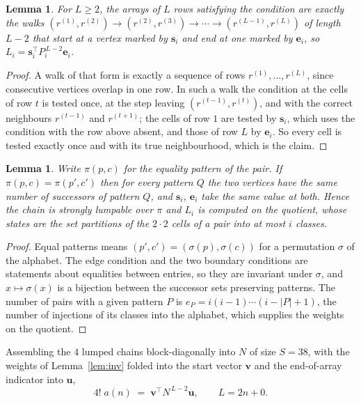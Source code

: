 \documentclass[11pt,a4paper]{article}
\theoremstyle{plain}
\newtheorem{lemma}[theorem]{Lemma}
\theoremstyle{definition}
\begin{document}
\begin{lemma}\label{lem:walk}
For $L\ge2$, the arrays of $L$ rows satisfying the condition are exactly the walks
$(r^{(1)},r^{(2)})\to(r^{(2)},r^{(3)})\to\cdots\to(r^{(L-1)},r^{(L)})$ of length
$L-2$ that start at a vertex marked by $\mathbf{s}_i$ and end at one marked by
$\mathbf{e}_i$, so
$L_i=\mathbf{s}_i^{\!\top}P_i^{\,L-2}\mathbf{e}_i$.
\end{lemma}

\begin{proof}
A walk of that form is exactly a sequence of rows $r^{(1)},\dots,r^{(L)}$, since
consecutive vertices overlap in one row. In such a walk the condition at the cells of
row $t$ is tested once, at the step leaving $(r^{(t-1)},r^{(t)})$, and with the
correct neighbours $r^{(t-1)}$ and $r^{(t+1)}$; the cells of row $1$ are tested by
$\mathbf{s}_i$, which uses the condition with the row above absent, and those of row
$L$ by $\mathbf{e}_i$. So every cell is tested exactly once and with its true
neighbourhood, which is the claim.
\end{proof}

\begin{lemma}\label{lem:lump}
Write $\pi(p,c)$ for the equality pattern of the pair. If $\pi(p,c)=\pi(p',c')$ then for
every pattern $Q$ the two vertices have the same number of successors of pattern $Q$, and
$\mathbf{s}_i$, $\mathbf{e}_i$ take the same value at both. Hence the chain is strongly
lumpable over $\pi$ and $L_i$ is computed on the quotient, whose states are the set
partitions of the $2\cdot2$ cells of a pair into at most $i$ classes.
\end{lemma}

\begin{proof}
Equal patterns means $(p',c')=(\sigma(p),\sigma(c))$ for a permutation $\sigma$ of the
alphabet. The edge condition and the two boundary conditions are statements about equalities
between entries, so they are invariant under $\sigma$, and $x\mapsto\sigma(x)$ is a bijection
between the successor sets preserving patterns. The number of pairs with a given pattern $P$
is $e_P=i(i-1)\cdots(i-|P|+1)$, the number of injections of its classes into the alphabet,
which supplies the weights on the quotient.
\end{proof}

Assembling the $4$ lumped chains block-diagonally into $N$ of size $S=38$, with the
weights of Lemma~\ref{lem:inv} folded into the start vector $\mathbf{v}$ and the
end-of-array indicator into $\mathbf{u}$,
\begin{equation}\label{eq:walk2}
4!\;a(n)\;=\;\mathbf{v}^{\!\top}N^{\,L-2}\mathbf{u},\qquad L=2n+0 .
\end{equation}
\end{document}

